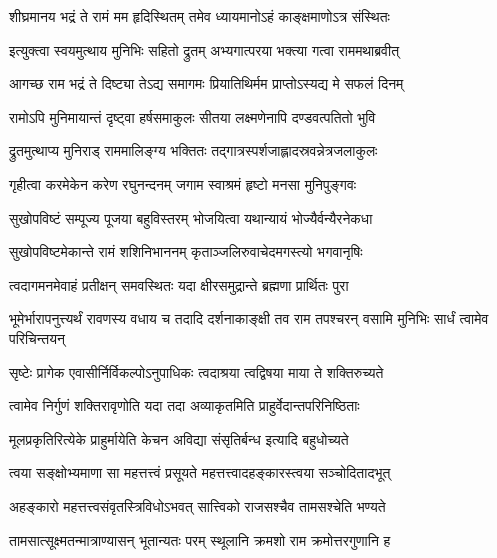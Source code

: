 


\addtocounter{shlokacount}{9}

\twolineshloka
{शीघ्रमानय भद्रं ते रामं मम हृदिस्थितम्}
{तमेव ध्यायमानोऽहं काङ्क्षमाणोऽत्र संस्थितः} %

\twolineshloka
{इत्युक्त्वा स्वयमुत्थाय मुनिभिः सहितो द्रुतम्}
{अभ्यगात्परया भक्त्या गत्वा राममथाब्रवीत्} %

\twolineshloka
{आगच्छ राम भद्रं ते दिष्ट्या तेऽद्य समागमः}
{प्रियातिथिर्मम प्राप्तोऽस्यद्य मे सफलं दिनम्} %

\twolineshloka
{रामोऽपि मुनिमायान्तं दृष्ट्वा हर्षसमाकुलः}
{सीतया लक्ष्मणेनापि दण्डवत्पतितो भुवि} %

\twolineshloka
{द्रुतमुत्थाप्य मुनिराड् राममालिङ्ग्य भक्तितः}
{तद्गात्रस्पर्शजाह्लादस्रवन्नेत्रजलाकुलः} %

\twolineshloka
{गृहीत्वा करमेकेन करेण रघुनन्दनम्}
{जगाम स्वाश्रमं हृष्टो मनसा मुनिपुङ्गवः} %

\twolineshloka
{सुखोपविष्टं सम्पूज्य पूजया बहुविस्तरम्}
{भोजयित्वा यथान्यायं भोज्यैर्वन्यैरनेकधा} %

\twolineshloka
{सुखोपविष्टमेकान्ते रामं शशिनिभाननम्}
{कृताञ्जलिरुवाचेदमगस्त्यो भगवानृषिः} %

\twolineshloka
{त्वदागमनमेवाहं प्रतीक्षन् समवस्थितः}
{यदा क्षीरसमुद्रान्ते ब्रह्मणा प्रार्थितः पुरा} %

\threelineshloka
{भूमेर्भारापनुत्त्यर्थं रावणस्य वधाय च}
{तदादि दर्शनाकाङ्क्षी तव राम तपश्चरन्}
{वसामि मुनिभिः सार्धं त्वामेव परिचिन्तयन्} %

\twolineshloka
{सृष्टेः प्रागेक एवासीर्निर्विकल्पोऽनुपाधिकः}
{त्वदाश्रया त्वद्विषया माया ते शक्तिरुच्यते} %

\twolineshloka
{त्वामेव निर्गुणं शक्तिरावृणोति यदा तदा}
{अव्याकृतमिति प्राहुर्वेदान्तपरिनिष्ठिताः} %

\twolineshloka
{मूलप्रकृतिरित्येके प्राहुर्मायेति केचन}
{अविद्या संसृतिर्बन्ध इत्यादि बहुधोच्यते} %

\twolineshloka
{त्वया सङ्क्षोभ्यमाणा सा महत्तत्त्वं प्रसूयते}
{महत्तत्त्वादहङ्कारस्त्वया सञ्चोदितादभूत्} %

\twolineshloka
{अहङ्कारो महत्तत्त्वसंवृतस्त्रिविधोऽभवत्}
{सात्त्विको राजसश्चैव तामसश्चेति भण्यते} %

\twolineshloka
{तामसात्सूक्ष्मतन्मात्राण्यासन् भूतान्यतः परम्}
{स्थूलानि क्रमशो राम क्रमोत्तरगुणानि ह} %

